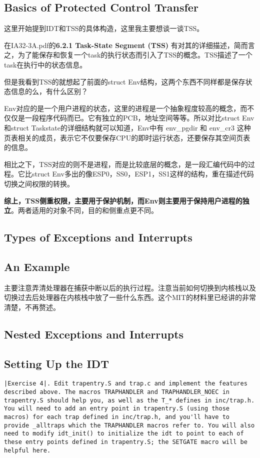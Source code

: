 \documentclass{article}
\newcommand{\highlight}[1]{{\bfseries \color{red}  #1}}
\begin{document}
\begin{CJK*}{UTF8}{gkai}
\subsection{Basics of Protected Control Transfer}

这里开始提到IDT和TSS的具体构造，这里我主要想谈一谈TSS。

在IA32-3A.pdf的{\ttfamily \bfseries 6.2.1 Task-State Segment (TSS) } 有对其的详细描述，简而言之，为了能保存和恢复一个task的执行状态而引入了TSS的概念。TSS描述了一个task在执行中的状态信息。

但是我看到TSS的就想起了前面的struct Env结构，这两个东西不同样都是保存状态信息的么，有什么区别？

Env对应的是一个用户进程的状态，这里的进程是一个抽象程度较高的概念，而不仅仅是一段程序代码而已。它有独立的PCB，地址空间等等。所以对比struct Env和struct Taskstate的详细结构就可以知道，Env中有 env\_pgdir 和 env\_cr3 这种页表相关的成员，表示它不仅要保存CPU的即时运行状态，还要保存其空间页表的信息。

相比之下，TSS对应的则不是进程，而是比较底层的概念，是一段汇编代码中的过程。它比struct Env多出的像ESP0，SS0，ESP1，SS1这样的结构，重在描述代码切换之间权限的转换。

\highlight{综上，TSS侧重权限，主要用于保护机制，而Env则主要用于保持用户进程的独立}。两者适用的对象不同，目的和侧重点更不同。


\subsection{Types of Exceptions and Interrupts}

\subsection{An Example}

主要注意弄清处理器在捕获中断以后的执行过程。注意当前如何切换到内核栈以及切换过去后处理器在内核栈中放了一些什么东西。这个MIT的材料里已经讲的非常清楚，不再赘述。

\subsection{Nested Exceptions and Interrupts}

\subsection{Setting Up the IDT}

\begin{lstlisting}[style=exercise]
|Exercise 4|. Edit trapentry.S and trap.c and implement the features described above. The macros TRAPHANDLER and TRAPHANDLER_NOEC in trapentry.S should help you, as well as the T_* defines in inc/trap.h. You will need to add an entry point in trapentry.S (using those macros) for each trap defined in inc/trap.h, and you'll have to provide _alltraps which the TRAPHANDLER macros refer to. You will also need to modify idt_init() to initialize the idt to point to each of these entry points defined in trapentry.S; the SETGATE macro will be helpful here.


\end{lstlisting}
\end{CJK*}
\end{document}
